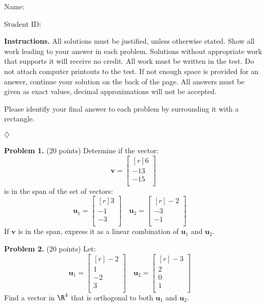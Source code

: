 \documentclass[12pt]{article}
\begin{document}
Name: \hrulefill

\bigskip
Student ID: \hrulefill

\bigskip
\textbf{Instructions.} All solutions must be justified, unless otherwise stated. Show all work leading to your answer in each problem. Solutions without appropriate work that supports it will receive no credit. All work must be written in the test. Do not attach computer printouts to the test. If not enough space is provided for an answer, continue your solution on the back of the page. All answers must be given as exact values, decimal approximations will not be accepted.

Please identify your final answer to each problem by surrounding it with a rectangle.

\vfill
\hfill$\diamondsuit$

\clearpage

\textbf{Problem 1.} (20 points)
Determine if the vector:
\[
\mathbf{v}=\begin{bmatrix*}[r]6\\ -13\\ -15\\ \end{bmatrix*}
\]
is in the span of the set of vectors:
\[
\mathbf{u}_1=\begin{bmatrix*}[r]3\\ -1\\ -3\\ \end{bmatrix*}\quad
\mathbf{u}_2=\begin{bmatrix*}[r]-2\\ -3\\ -1\\ \end{bmatrix*}\quad
\]
If $\mathbf{v}$ is in the span, 
express it as a linear combination of $\mathbf{u}_1$ and $\mathbf{u}_2$.


\clearpage

\textbf{Problem 2.} (20 points)
Let:
\[\mathbf{u}_1=\begin{bmatrix*}[r]-2\\ 1\\ -2\\ 3\\ \end{bmatrix*}\quad
\mathbf{u}_2=\begin{bmatrix*}[r]-3\\ 2\\ 0\\ 1\\ \end{bmatrix*}\quad
\]
Find a vector in $\R^4$ that is orthogonal to both $\textbf{u}_1$ and  $\textbf{u}_2$.
\clearpage
\end{document}
